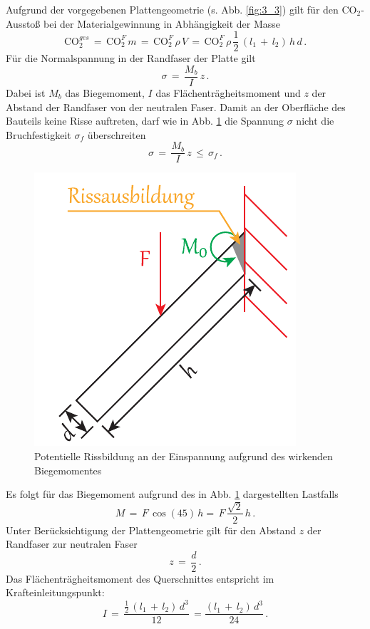 Aufgrund der vorgegebenen Plattengeometrie (s. Abb. \ref{fig:3_3}) gilt für den CO$_2$-Ausstoß bei der Materialgewinnung in Abhängigkeit der Masse
\begin{equation}\label{masse32}
\text{CO}_2^{ges}\,=\,\text{CO}_2^F\,m\,=\,\text{CO}_2^F\,\rho\,V\,=\,\text{CO}_2^F\,\rho\,\frac{1}{2}\,(l_1\,+\,l_2)\,h\,d\,.
\end{equation}
Für die Normalspannung in der Randfaser der Platte gilt
\begin{equation}
\sigma\,=\,\frac{M_b}{I}\,z\,.
\end{equation}
Dabei ist $M_b$ das Biegemoment, $I$ das Flächenträgheitsmoment und $z$ der Abstand der Randfaser von der neutralen Faser. Damit an der Oberfläche des Bauteils keine Risse auftreten, darf wie in Abb. \ref{fig:3_4} die Spannung $\sigma$ nicht die Bruchfestigkeit $\sigma_f$ überschreiten
\begin{equation}\label{bruchfestigkeit32}
\sigma\,=\,\frac{M_b}{I}\,z\,\le\,\sigma_f\,.
\end{equation}
\begin{figure}[H]
	\centering
	\includegraphics[width=0.4\linewidth]{chapter/Bilder/3_4}
	\caption{Potentielle Rissbildung an der Einspannung aufgrund des wirkenden Biegemomentes}
	\label{fig:3_4}
\end{figure}
Es folgt für das Biegemoment aufgrund des in Abb. \ref{fig:3_4} dargestellten Lastfalls
\begin{equation}\label{lastfall32}
M\,=\,F\,\cos(45)\,h=\,F\,\frac{\sqrt{2}}{2}\,h\,.
\end{equation}
Unter Berücksichtigung der Plattengeometrie gilt für den Abstand $z$ der Randfaser zur neutralen Faser
\begin{equation}\label{geometrie32}
z\,=\,\frac{d}{2}\,.
\end{equation}
Das Flächenträgheitsmoment des Querschnittes entspricht im Krafteinleitungspunkt:
\begin{equation}\label{flächen32}
I\,=\,\frac{\frac{1}{2}\,(l_1\,+\,l_2)\,d^3}{12}\,=\frac{(l_1\,+\,l_2)\,d^3}{24}\,.
\end{equation}
